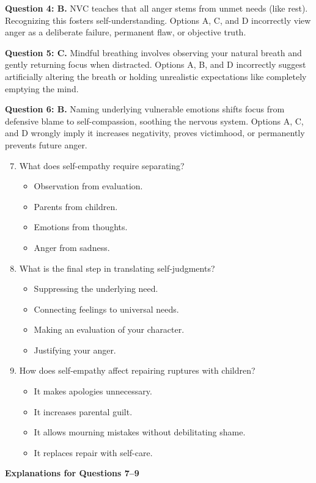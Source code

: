 \begin{practiceexercise}
\textbf{Question 4: B.} NVC teaches that all anger stems from unmet needs (like rest). Recognizing this fosters self-understanding. Options A, C, and D incorrectly view anger as a deliberate failure, permanent flaw, or objective truth.

\textbf{Question 5: C.} Mindful breathing involves observing your natural breath and gently returning focus when distracted. Options A, B, and D incorrectly suggest artificially altering the breath or holding unrealistic expectations like completely emptying the mind.

\textbf{Question 6: B.} Naming underlying vulnerable emotions shifts focus from defensive blame to self-compassion, soothing the nervous system. Options A, C, and D wrongly imply it increases negativity, proves victimhood, or permanently prevents future anger.
\vspace{\fill}
\newpage

\begin{enumerate}
    \setcounter{enumi}{6}
    \item What does self-empathy require separating?
    \begin{itemize}
        \item[A)] Observation from evaluation.
        \item[B)] Parents from children.
        \item[C)] Emotions from thoughts.
        \item[D)] Anger from sadness.
    \end{itemize}
  \item What is the final step in translating self-judgments?
    \begin{itemize}
        \item[A)] Suppressing the underlying need.
        \item[B)] Connecting feelings to universal needs.
        \item[C)] Making an evaluation of your character.
        \item[D)] Justifying your anger.
    \end{itemize}
  \item How does self-empathy affect repairing ruptures with children?
    \begin{itemize}
        \item[A)] It makes apologies unnecessary.
        \item[B)] It increases parental guilt.
        \item[C)] It allows mourning mistakes without debilitating shame.
        \item[D)] It replaces repair with self-care.
    \end{itemize}
\end{enumerate}
\vspace{\baselineskip}
\newpage
\textbf{Explanations for Questions 7--9}


\end{practiceexercise}

